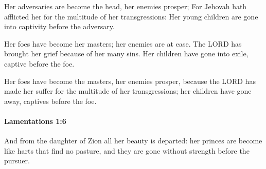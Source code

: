 			\begin{versebox}
					\item[BHS] 
					\item[LXX] 
					\item[ASV] Her adversaries are become the head, her enemies prosper; For Jehovah hath afflicted her for the multitude of her transgressions: Her young children are gone into captivity before the adversary.
					\item[NIV] Her foes have become her masters; her enemies are at ease. The LORD has brought her grief because of her many sins. Her children have gone into exile, captive before the foe.
					\item[NRSV] Her foes have become the masters, her enemies prosper, because the LORD has made her suffer for the multitude of her transgressions; her children have gone away, captives before the foe.
			\end{versebox}

		\paragraph{Lamentations 1:6} %
			\label{LAMENTATIONS-1-6}

			And from the daughter of Zion all her beauty is departed: her princes are become like harts that find no pasture, and they are gone without strength before the pursuer.

